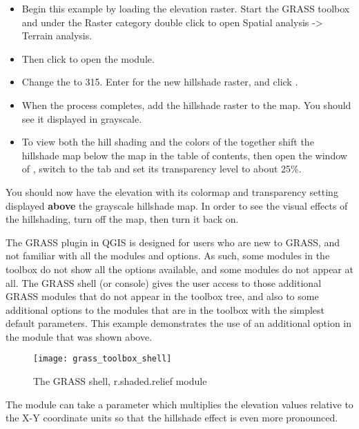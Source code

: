 \begin{itemize}[label=--]
\item Begin this example by loading the  elevation raster.
Start the GRASS toolbox and under the Raster category double click to open Spatial
analysis -> Terrain analysis. 
\item Then click  to open
the module. 
\item Change the  to 315. Enter
 for the  new hillshade raster, and click . 
\item When the process completes, add the hillshade raster to the map. You
should see it displayed in grayscale. 
\item To view both the hill shading and the colors of the
 together shift the hillshade map below the
 map in the table of contents, then open the
 window of , switch to the
 tab and set its transparency level to about 25\%. 
\end{itemize}

You should now have the  elevation with its colormap and
transparency setting displayed \textbf{above} the grayscale hillshade map. In
order to see the visual effects of the hillshading, turn off the
 map, then turn it back on.

 
The GRASS plugin in QGIS is designed for users who are new to GRASS, and not
familiar with all the modules and options. As such, some modules in the
toolbox do not show all the options available, and some modules do not appear
at all. The GRASS shell (or console) gives the user access to those
additional GRASS modules that do not appear in the toolbox tree, and also to
some additional options to the modules that are in the toolbox with the
simplest default parameters. This example demonstrates the use of an
additional option in the  module that was shown
above.

\begin{figure}[ht]
 \centering
 \texttt{[image: grass\_toolbox\_shell]}
 \caption{The GRASS shell, r.shaded.relief module \nixcaption}\label{fig:grass_toolbox_shell}
\end{figure}

The module  can take a parameter 
which multiplies the elevation values relative to the X-Y coordinate units so
that the hillshade effect is even more pronounced. 

